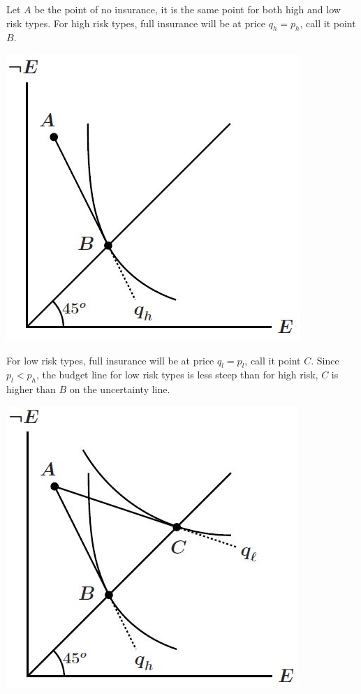 \documentclass[12pt]{report}
\begin{document}
\begin{minipage}{0.69\textwidth}
Let $A$ be the point of no insurance, it is the same point for both high and low risk types. For high risk types, full insurance will be at price $q_h = p_h$, call it point $B$. 
\end{minipage}
\begin{minipage}{0.29\textwidth}
\centering
\includegraphics[scale=0.35]{images/hirisk}
\end{minipage} \hfill

\begin{minipage}{0.69\textwidth}
For low risk types, full insurance will be at price $q_l = p_l$, call it point $C$. Since $p_l < p_h$, the budget line for low risk types is less steep than for high risk, $C$ is higher than $B$ on the uncertainty line.
\end{minipage}
\begin{minipage}{0.29\textwidth}
\centering
\includegraphics[scale=0.35]{images/lorisk}
\end{minipage} \hfill
\end{document}
